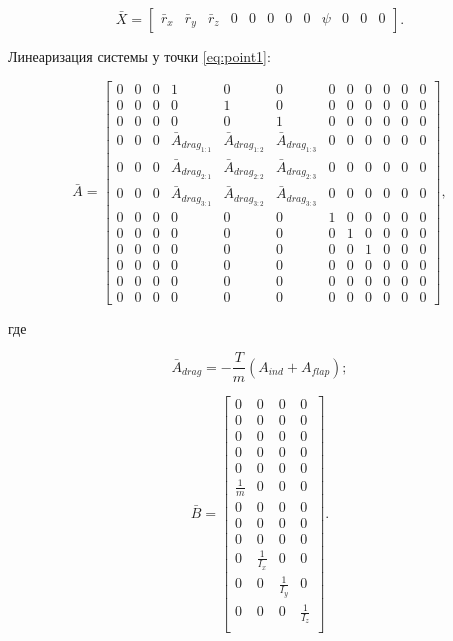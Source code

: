 \begin{equation}
    \bar{X} = \begin{bmatrix}
        \bar{r}_x & \bar{r}_y & \bar{r}_z & 0 & 0 & 0 & 0 & 0 & \psi & 0 & 0 & 0 
    \end{bmatrix}.
    \label{eq:point1}
\end{equation}

Линеаризация системы у точки \eqref{eq:point1}:


\begin{equation}
    \bar{A} = 
    \begin{bmatrix}
    0 & 0 & 0 & 1 & 0 & 0 & 0 & 0 & 0 & 0 & 0 & 0 \\
    0 & 0 & 0 & 0 & 1 & 0 & 0 & 0 & 0 & 0 & 0 & 0 \\
    0 & 0 & 0 & 0 & 0 & 1 & 0 & 0 & 0 & 0 & 0 & 0 \\
    0 & 0 & 0 & \bar{A}_{drag_{1:1}} & \bar{A}_{drag_{1:2}} & \bar{A}_{drag_{1:3}} & 0 & 0 & 0 & 0 & 0 & 0 \\
    0 & 0 & 0 & \bar{A}_{drag_{2:1}} & \bar{A}_{drag_{2:2}} & \bar{A}_{drag_{2:3}} & 0 & 0 & 0 & 0 & 0 & 0 \\
    0 & 0 & 0 & \bar{A}_{drag_{3:1}} & \bar{A}_{drag_{3:2}} & \bar{A}_{drag_{3:3}} & 0 & 0 & 0 & 0 & 0 & 0 \\
    0 & 0 & 0 & 0 & 0 & 0 & 1 & 0 & 0 & 0 & 0 & 0 \\
    0 & 0 & 0 & 0 & 0 & 0 & 0 & 1 & 0 & 0 & 0 & 0 \\
    0 & 0 & 0 & 0 & 0 & 0 & 0 & 0 & 1 & 0 & 0 & 0 \\
    0 & 0 & 0 & 0 & 0 & 0 & 0 & 0 & 0 & 0 & 0 & 0 \\
    0 & 0 & 0 & 0 & 0 & 0 & 0 & 0 & 0 & 0 & 0 & 0 \\
    0 & 0 & 0 & 0 & 0 & 0 & 0 & 0 & 0 & 0 & 0 & 0
\end{bmatrix},
\end{equation}

где  

\begin{equation}
    \bar{A}_{drag} = - \frac{T}{m} (A_{ind} + A_{flap});
\end{equation}


\begin{equation}
    \bar{B} = \begin{bmatrix}
    0 & 0 & 0 & 0 \\
    0 & 0 & 0 & 0 \\
    0 & 0 & 0 & 0 \\
    0 & 0 & 0 & 0 \\
    0 & 0 & 0 & 0 \\
    \frac{1}{m} & 0 & 0 & 0 \\
    0 & 0 & 0 & 0 \\
    0 & 0 & 0 & 0 \\
    0 & 0 & 0 & 0 \\
    0 & \frac{1}{I_x} & 0 & 0 \\
    0 & 0 & \frac{1}{I_y} & 0 \\
    0 & 0 & 0 & \frac{1}{I_z} \\
    \end{bmatrix}.
\end{equation}

